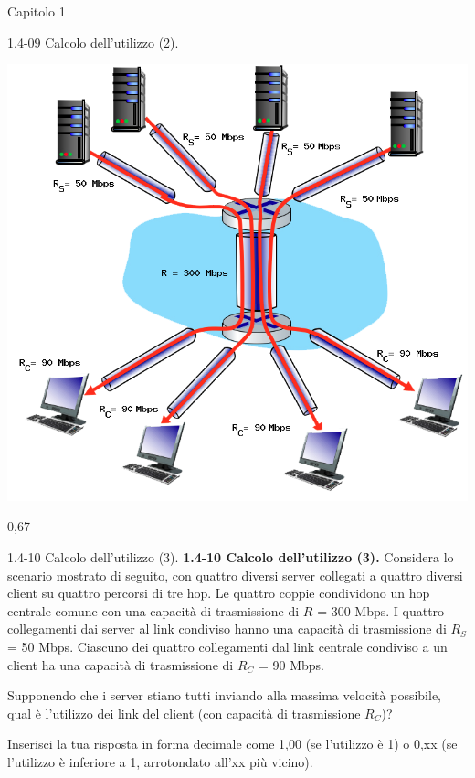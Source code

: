 \documentclass[a4paper]{article}
\begin{document}
\begin{quiz}{Capitolo 1}
\begin{shortanswer}[points=1,shuffle=true]{1.4-09 Calcolo dell'utilizzo (2).}
\begin{center}
\includegraphics[width=0.7\linewidth]{figs/1.4.7.png}
\end{center}
\item 0,67
\end{shortanswer}

\begin{shortanswer}[points=1,shuffle=true]{1.4-10 Calcolo dell'utilizzo (3).}
\textbf{1.4-10 Calcolo dell'utilizzo (3).} 
Considera lo scenario mostrato di seguito, con quattro diversi server collegati a quattro diversi client su quattro percorsi di tre hop. Le quattro coppie condividono un hop centrale comune con una capacità di trasmissione di $R$ = 300 Mbps. I quattro collegamenti dai server al link condiviso hanno una capacità di trasmissione di $R_S$ = 50 Mbps. Ciascuno dei quattro collegamenti dal link centrale condiviso a un client ha una capacità di trasmissione di $R_C$ = 90 Mbps. 

Supponendo che i server stiano tutti inviando alla massima velocità possibile, qual è l'utilizzo dei link del client (con capacità di trasmissione $R_C$)? 

Inserisci la tua risposta in forma decimale come 1,00 (se l'utilizzo è 1) o 0,xx (se l'utilizzo è inferiore a 1, arrotondato all'xx più vicino).


\end{shortanswer}
\end{quiz}
\end{document}
